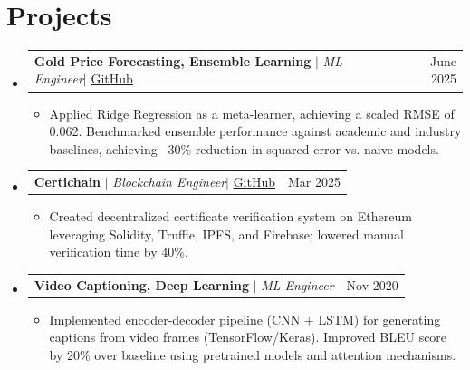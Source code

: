 \documentclass[letterpaper,11pt]{article}
\makeatletter
\newcommand{\resumeItem}[1]{
  \item\small{#1 \vspace{-4pt}}
}
\newcommand{\resumeProjectHeading}[2]{
  \item
    \begin{tabular*}{0.97\textwidth}{l@{\extracolsep{\fill}}r}
      \small#1 & #2 \\
    \end{tabular*}\vspace{-4pt}
}
\newcommand{\resumeSubHeadingListStart}{
  \begin{itemize}[leftmargin=0.0in, label={}]
    \setlength{\parskip}{0pt}
}
\newcommand{\resumeSubHeadingListEnd}{
  \end{itemize}
}
\newcommand{\resumeItemListStart}{
  \begin{itemize}[leftmargin=0.15in, labelsep=0.05in]
}
\newcommand{\resumeItemListEnd}{
  \end{itemize}\vspace{-4pt}
}
\makeatother
\begin{document}
\vspace{-2pt}
\section{Projects}
\resumeSubHeadingListStart
  \resumeProjectHeading{\textbf{Gold Price Forecasting, Ensemble Learning} $|$ \emph{ML Engineer}$|$ \href{https://github.com/abhin2149/gold_price_prediction_ensemble}{GitHub}}{June 2025}
  \resumeItemListStart
    \resumeItem{Applied Ridge Regression as a meta-learner, achieving a scaled RMSE of 0.062. Benchmarked ensemble performance against academic and industry baselines, achieving ~30\% reduction in squared error vs. naive models.}
  \resumeItemListEnd
  \resumeProjectHeading{\textbf{Certichain} $|$ \emph{Blockchain Engineer}$|$ \href{https://github.com/abhin2149/certichain}{GitHub}}{Mar 2025}
  \resumeItemListStart
    \resumeItem{Created decentralized certificate verification system on Ethereum leveraging Solidity, Truffle, IPFS, and Firebase; lowered manual verification time by 40\%.}
  \resumeItemListEnd

  \resumeProjectHeading{\textbf{Video Captioning, Deep Learning} $|$ \emph{ML Engineer}}{Nov 2020}
  \resumeItemListStart
    \resumeItem{Implemented encoder-decoder pipeline (CNN + LSTM) for generating captions from video frames (TensorFlow/Keras). Improved BLEU score by 20\% over baseline using pretrained models and attention mechanisms.}
  \resumeItemListEnd
\resumeSubHeadingListEnd
\end{document}
